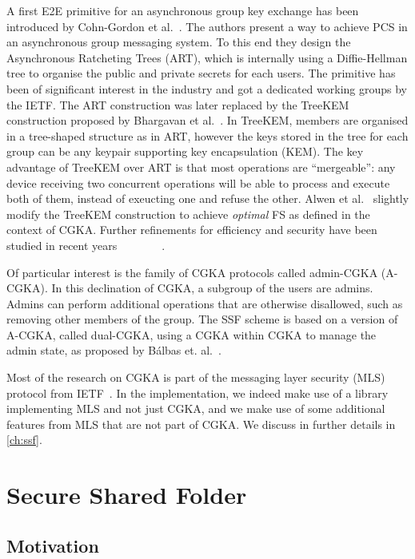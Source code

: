 A first E2E primitive for an asynchronous group key exchange 
has been introduced by Cohn-Gordon et al.~\cite{CCS:CCGMM18}.
The authors present a way to achieve PCS in an asynchronous group messaging system. 
To this end they design the Asynchronous Ratcheting Trees (ART),
which is internally using a Diffie-Hellman tree to organise the
public and private secrets for each users.
The primitive has been of significant interest in the industry and
got a dedicated working groups by the IETF.
The ART construction was later replaced by the TreeKEM
construction proposed by Bhargavan et al.~\cite{TreeKEM}.
In TreeKEM, members are organised in a tree-shaped structure
as in ART, however the keys stored in the tree for each group
can be any keypair supporting key encapsulation (KEM).
The key advantage of TreeKEM over ART is that
most operations are ``mergeable'':
any device receiving two
concurrent operations will be able to process and execute both of them,
instead of exeucting one and refuse the other.
Alwen et al.~\cite{C:ACDT20} slightly modify the TreeKEM construction
to achieve \textit{optimal} FS as defined in the context of CGKA.
Further refinements for efficiency and security have 
been studied in recent years~\cite{TCC:ACJM20}~\cite{SP:KPWKCCMYAP21}~\cite{CCS:ACDT21}~\cite{CCS:AHKM22}~\cite{EC:AANKPPW22}~\cite{C:AlwJosMul22}~\cite{C:AlwMulTse23}~\cite{IWSPA:KEONO23}.

Of particular interest is the family of CGKA protocols called admin-CGKA (A-CGKA).
In this declination of CGKA, a subgroup of the users are admins. 
Admins can perform additional operations that are otherwise disallowed, such as removing other members of the group.
The SSF scheme is based on a version of A-CGKA, called dual-CGKA, using a CGKA within CGKA to manage the admin state, as proposed by
B{\'a}lbas et. al.~\cite{USENIX:BalColVau23}.

Most of the research on CGKA is part of the messaging layer security (MLS) protocol from IETF~\cite{rfc9420}.
In the implementation, we indeed make use of a library implementing MLS and not just CGKA,
and we make use of some additional features from MLS that are not part of CGKA.
We discuss in further details in \cref{ch:ssf}.

\section{Secure Shared Folder}\label{sc:SSF}

\subsection{Motivation}

